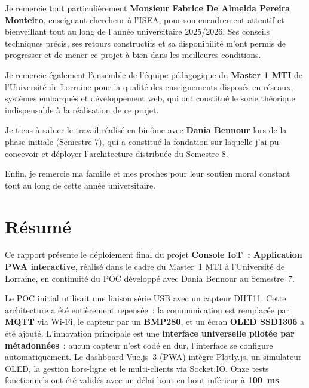 \documentclass[12pt, a4paper]{report}
\begin{document}
Je remercie tout particuli\`erement \textbf{Monsieur Fabrice De Almeida
Pereira Monteiro}, enseignant-chercheur \`a l'ISEA, pour son encadrement
attentif et bienveillant tout au long de l'ann\'ee universitaire
2025/2026. Ses conseils techniques pr\'ecis, ses retours constructifs et
sa disponibilit\'e m'ont permis de progresser et de mener ce projet \`a
bien dans les meilleures conditions.

Je remercie \'egalement l'ensemble de l'\'equipe p\'edagogique du
\textbf{Master 1 MTI} de l'Universit\'e de Lorraine pour la qualit\'e
des enseignements dispos\'es en r\'eseaux, syst\`emes embarqu\'es et
d\'eveloppement web, qui ont constitu\'e le socle th\'eorique
indispensable \`a la r\'ealisation de ce projet.

Je tiens \`a saluer le travail r\'ealis\'e en bin\^ome avec
\textbf{Dania Bennour} lors de la phase initiale (Semestre 7), qui a
constitu\'e la fondation sur laquelle j'ai pu concevoir et d\'eployer
l'architecture distribu\'ee du Semestre 8.

Enfin, je remercie ma famille et mes proches pour leur soutien moral
constant tout au long de cette ann\'ee universitaire.

\chapter*{R\'esum\'e}
\thispagestyle{fancy}

Ce rapport pr\'esente le d\'eploiement final du projet
\textbf{Console IoT~: Application PWA interactive}, r\'ealis\'e dans
le cadre du Master~1 MTI \`a l'Universit\'e de Lorraine, en
continuit\'e du POC d\'evelopp\'e avec Dania Bennour au Semestre~7.

Le POC initial utilisait une liaison s\'erie USB avec un capteur
DHT11. Cette architecture a \'et\'e enti\`erement repens\'ee~:
la communication est remplac\'ee par \textbf{MQTT} via Wi-Fi, le
capteur par un \textbf{BMP280}, et un \'ecran \textbf{OLED SSD1306}
a \'et\'e ajout\'e. L'innovation principale est une
\textbf{interface universelle pilot\'ee par m\'etadonn\'ees}~:
aucun capteur n'est cod\'e en dur, l'interface se configure
automatiquement. Le dashboard Vue.js~3 (PWA) int\`egre Plotly.js,
un simulateur OLED, la gestion hors-ligne et le multi-clients via
Socket.IO. Onze tests fonctionnels ont \'et\'e valid\'es avec un
d\'elai bout en bout inf\'erieur \`a \textbf{100~ms}.
\end{document}
